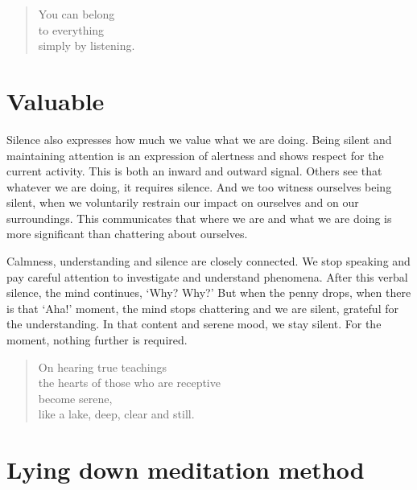 \begin{quote}
You can belong\\
to everything\\
simply by listening.
\end{quote}

\section{Valuable}


\noindent Silence also expresses how much we value what we are doing.
Being silent and maintaining attention is an expression of alertness and
shows respect for the current activity. This is both an inward and
outward signal. Others see that whatever we are doing, it requires
silence. And we too witness ourselves being silent, when we voluntarily
restrain our impact on ourselves and on our surroundings. This
communicates that where we are and what we are doing is more significant
than chattering about ourselves.

Calmness, understanding and silence are closely connected. We stop
speaking and pay careful attention to investigate and understand
phenomena. After this verbal silence, the mind continues, `Why? Why?'
But when the penny drops, when there is that `Aha!' moment, the mind
stops chattering and we are silent, grateful for the understanding. In
that content and serene mood, we stay silent. For the moment, nothing
further is required.

\begin{quote}
On hearing true teachings\\
the hearts of those who are receptive\\
become serene,\\
like a lake, deep, clear and still.

\bigskip

\end{quote}

\section{Lying down meditation method}

